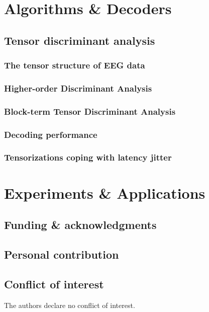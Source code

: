 \part{Algorithms \& Decoders}

\chapter{Tensor discriminant analysis}
\section{The tensor structure of EEG data}
\section{Higher-order Discriminant Analysis}
\section{Block-term Tensor Discriminant Analysis}
\section{Decoding performance}
\section{Tensorizations coping with latency jitter}

\part{Experiments \& Applications}

\backmatter%
\pagestyle{front}
\chapter{Funding \& acknowledgments}
\chapter{Personal contribution}
\chapter{Conflict of interest}
The authors declare no conflict of interest.


